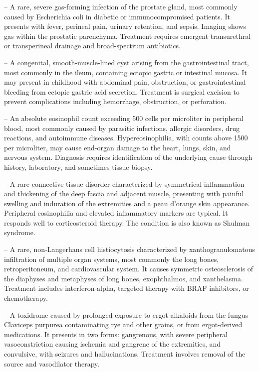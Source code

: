 -- A rare, severe gas-forming infection of the prostate gland, most commonly caused by Escherichia coli in diabetic or immunocompromised patients. It presents with fever, perineal pain, urinary retention, and sepsis. Imaging shows gas within the prostatic parenchyma. Treatment requires emergent transurethral or transperineal drainage and broad-spectrum antibiotics.

-- A congenital, smooth-muscle-lined cyst arising from the gastrointestinal tract, most commonly in the ileum, containing ectopic gastric or intestinal mucosa. It may present in childhood with abdominal pain, obstruction, or gastrointestinal bleeding from ectopic gastric acid secretion. Treatment is surgical excision to prevent complications including hemorrhage, obstruction, or perforation.

-- An absolute eosinophil count exceeding 500 cells per microliter in peripheral blood, most commonly caused by parasitic infections, allergic disorders, drug reactions, and autoimmune diseases. Hypereosinophilia, with counts above 1500 per microliter, may cause end-organ damage to the heart, lungs, skin, and nervous system. Diagnosis requires identification of the underlying cause through history, laboratory, and sometimes tissue biopsy.

-- A rare connective tissue disorder characterized by symmetrical inflammation and thickening of the deep fascia and adjacent muscle, presenting with painful swelling and induration of the extremities and a peau d'orange skin appearance. Peripheral eosinophilia and elevated inflammatory markers are typical. It responds well to corticosteroid therapy. The condition is also known as Shulman syndrome.

-- A rare, non-Langerhans cell histiocytosis characterized by xanthogranulomatous infiltration of multiple organ systems, most commonly the long bones, retroperitoneum, and cardiovascular system. It causes symmetric osteosclerosis of the diaphyses and metaphyses of long bones, exophthalmos, and xanthelasma. Treatment includes interferon-alpha, targeted therapy with BRAF inhibitors, or chemotherapy.

-- A toxidrome caused by prolonged exposure to ergot alkaloids from the fungus Claviceps purpurea contaminating rye and other grains, or from ergot-derived medications. It presents in two forms: gangrenous, with severe peripheral vasoconstriction causing ischemia and gangrene of the extremities, and convulsive, with seizures and hallucinations. Treatment involves removal of the source and vasodilator therapy.

